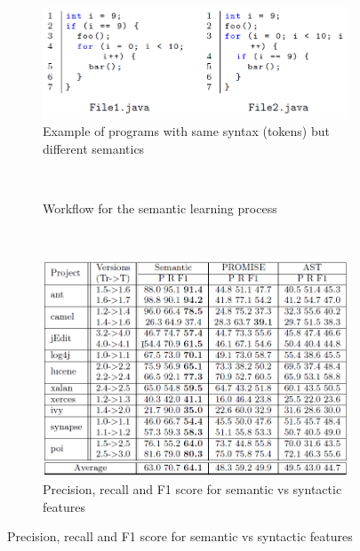  \begin{figure}[H]
     \begin{subfigure}{1\textwidth}
         \centering
         \includegraphics[scale=0.5]{./src/deeplearning_example.png}
         \caption{Example of programs with same syntax (tokens) but different semantics}\label{deeplearning:example}
     \end{subfigure}\\
     \begin{subfigure}{\textwidth}
         \centering
         \caption{Workflow for the semantic learning process}\label{deeplearning:workflow}
     \end{subfigure}\\
     \begin{subfigure}{1\textwidth}
         \centering
         \includegraphics[scale=0.4]{./src/deeplearning_results.png}
         \caption{Precision, recall and F1 score for semantic vs syntactic features}\label{deeplearning:results}
     \end{subfigure}
 \end{figure}


